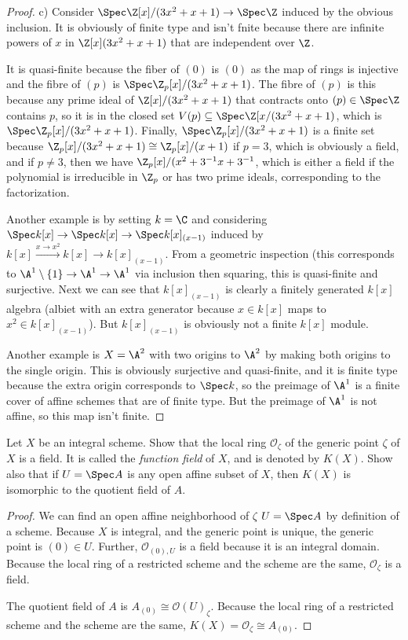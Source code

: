 \begin{proof}
	c) Consider $\Spec \Z[x] / (3x^2+x+1) \to \Spec \Z$ induced by the obvious inclusion.
	It is obviously of finite type and isn't fnite because there are infinite powers of $x $ in $\Z[x] (3x^2+x+1) $ that are independent over $\Z $.

	It is quasi-finite because the fiber of $(0) $ is $(0) $ as the map of rings is injective and the fibre of $(p) $ is $\Spec \Z_p[x] / (3x^2 + x+1)$.
	The fibre of $(p) $ is this because any prime ideal of $\Z[x] / (3x^2+x+1) $ that contracts onto $(p) \in \Spec \Z $ contains $p $, so it is in the closed set $V(p) \subseteq \Spec \Z[x / (3x^2+x+1)$, which is $\Spec \Z_p[x] / (3x^2+x+1) $.
	Finally, $\Spec \Z_p[x] / (3x^2+x+1) $ is a finite set because $\Z_p[x] / (3x^2+x+1) \cong \Z_p[x] / (x+1) $ if $p=3 $, which is obviously a field, and if $p\ne 3 $, then we have $\Z_p[x] / (x^2+3^{-1}x+3^{-1} $, which is either a field if the polynomial is irreducible in $\Z_p $ or has two prime ideals, corresponding to the factorization.

	Another example is by setting $k=\C $ and considering $\Spec k[x] \to \Spec k[x] \to \Spec k[x]_{(x-1)} $ induced by $k[x] \xrightarrow{x\to x^2} k[x] \to k[x]_{(x-1)} $.
	From a geometric inspection (this corresponds to $\A^1\setminus \{1\}   \to \A^1 \to \A^1  $ via inclusion then squaring, this is quasi-finite and surjective.
	Next we can see that $k[x]_{(x-1)} $ is clearly a finitely generated $k[x] $ algebra (albiet with an extra generator because $x\in k[x] $ maps to $x^2 \in k[x]_{(x-1)} $).
	But $k[x] _{(x-1)} $ is obviously not a finite $k[x] $ module.

	Another example is $X = \A^2 $ with two origins to $\A^2 $ by making both origins to the single origin.
	This is obviously surjective and quasi-finite, and it is finite type because the extra origin corresponds to $\Spec k$, so the preimage of $\A^1 $ is a finite cover of affine schemes that are of finite type.
	But the preimage of $\A^1 $ is not affine, so this map isn't finite.
\end{proof}

\begin{exercise}%
	Let $X $ be an integral scheme. Show that the local ring $\mathcal{O}_{\zeta} $ of the generic point $\zeta  $ of $X $ is a field. It is called the \textit{function field} of $X $, and is denoted by $K(X) $. Show also that if $U = \Spec A $ is any open affine subset of $X $, then $K(X) $ is isomorphic to the quotient field of $A $.
\end{exercise}
\begin{proof}
	We can find an open affine neighborhood of $\zeta  $ $U = \Spec A $ by definition of a scheme.
	Because $X $ is integral, and the generic point is unique, the generic point is $(0) \in U $.
	Further, $\mathcal{O}_{(0),U} $ is a field because it is an integral domain.
	Because the local ring of a restricted scheme and the scheme are the same, $\mathcal{O}_{\zeta } $ is a field.

	The quotient field of $A $ is $A_{(0)} \cong \mathcal{O}(U)_{\zeta} $.
	Because the local ring of a restricted scheme and the scheme are the same, $K(X) = \mathcal{O}_{\zeta }\cong A_{(0)} $.
\end{proof}

